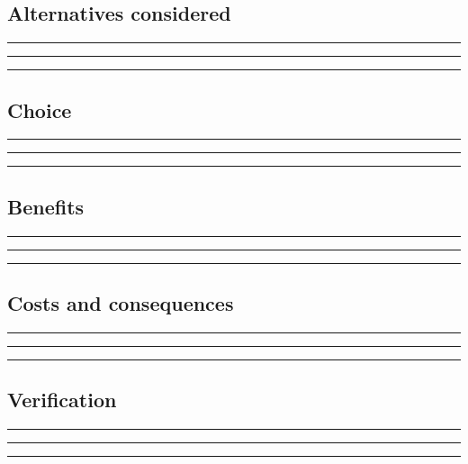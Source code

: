 \documentclass[11pt]{article}
\begin{document}
\subsection{Alternatives considered}
\noindent\rule{\linewidth}{0.3pt}\par\vspace{0.18in}
\noindent\rule{\linewidth}{0.3pt}\par\vspace{0.18in}
\noindent\rule{\linewidth}{0.3pt}\par\vspace{0.14in}

\subsection{Choice}
\noindent\rule{\linewidth}{0.3pt}\par\vspace{0.18in}
\noindent\rule{\linewidth}{0.3pt}\par\vspace{0.18in}
\noindent\rule{\linewidth}{0.3pt}\par\vspace{0.14in}

\subsection{Benefits}
\noindent\rule{\linewidth}{0.3pt}\par\vspace{0.18in}
\noindent\rule{\linewidth}{0.3pt}\par\vspace{0.18in}
\noindent\rule{\linewidth}{0.3pt}\par\vspace{0.14in}

\subsection{Costs and consequences}
\noindent\rule{\linewidth}{0.3pt}\par\vspace{0.18in}
\noindent\rule{\linewidth}{0.3pt}\par\vspace{0.18in}
\noindent\rule{\linewidth}{0.3pt}\par\vspace{0.14in}

\subsection{Verification}
\noindent\rule{\linewidth}{0.3pt}\par\vspace{0.18in}
\noindent\rule{\linewidth}{0.3pt}\par\vspace{0.18in}
\noindent\rule{\linewidth}{0.3pt}\par\vspace{0.14in}
\end{document}

